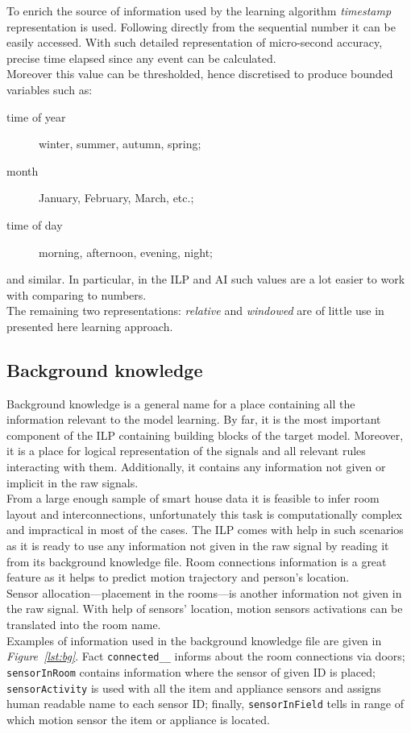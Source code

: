 \documentclass[10pt, a4paper, pdflatex, leqno, twoside, openright]{report}
\begin{document}
To enrich the source of information used by the learning algorithm \emph{timestamp} representation is used. Following directly from the sequential number it can be easily accessed. With such detailed representation of micro-second accuracy, precise time elapsed since any event can be calculated.\\
Moreover this value can be thresholded, hence discretised to produce bounded variables such as:
\begin{description}
\item[time of year] winter, summer, autumn, spring;
\item[month] January, February, March, etc.;
\item[time of day] morning, afternoon, evening, night;
\end{description}
and similar. In particular, in the ILP and AI such values are a lot easier to work with comparing to numbers.\\

The remaining two representations: \emph{relative} and \emph{windowed} are of little use in presented here learning approach.

    \subsection{Background knowledge\label{sec:data:bkg}}
Background knowledge is a general name for a place containing all the information relevant to the model learning. By far, it is the most important component of the ILP containing building blocks of the target model. Moreover, it is a place for logical representation of the signals and all relevant rules interacting with them. Additionally, it contains any information not given or implicit in the raw signals.\\

From a large enough sample of smart house data it is feasible to infer room layout and interconnections, unfortunately this task is computationally complex and impractical in most of the cases. The ILP comes with help in such scenarios as it is ready to use any information not given in the raw signal by reading it from its background knowledge file. Room connections information is a great feature as it helps to predict motion trajectory and person's location.\\
Sensor allocation---placement in the rooms---is another information not given in the raw signal. With help of sensors' location, motion sensors activations can be translated into the room name.\\
Examples of information used in the background knowledge file are given in \emph{Figure~\ref{lst:bg}}. Fact \texttt{connected\_\_} informs about the room connections via doors; \texttt{sensorInRoom} contains information where the sensor of given ID is placed; \texttt{sensorActivity} is used with all the item and appliance sensors and assigns human readable name to each sensor ID; finally, \texttt{sensorInField} tells in range of which motion sensor the item or appliance is located.\\
\end{document}
